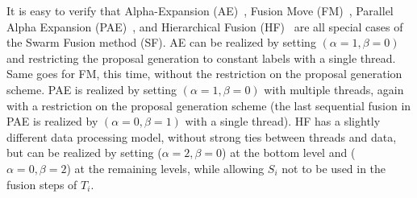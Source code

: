 \noindent It is easy to verify that Alpha-Expansion
(AE)~\cite{alpha_expansion}, Fusion Move (FM)~\cite{fusion_moves_for_markov_random_field_optimization}, Parallel
Alpha Expansion (PAE)~\cite{fusion_moves_for_markov_random_field_optimization}, and Hierarchical Fusion
(HF)~\cite{delong_hierarchical_fusion,olga_hierarchical_alpha_expansion} are all special cases of the Swarm
Fusion method (SF). AE can be realized by setting $(\alpha=1, \beta=0)$ and
restricting the proposal generation to constant labels with a single
thread. Same goes for FM, this time, without the restriction on the
proposal generation scheme. PAE is realized by setting
$(\alpha=1,\beta=0)$ with multiple threads, again with a restriction on
the proposal generation scheme (the last sequential fusion in PAE is
realized by $(\alpha=0, \beta=1)$ with a single thread).
%
HF has a slightly different data processing model, without strong ties
between threads and data, but can be realized by setting ($\alpha=2,
\beta=0$) at the bottom level and ($\alpha=0, \beta=2$) at the remaining
levels, while allowing $S_i$ not to be used in the fusion steps of
$T_i$.





%

